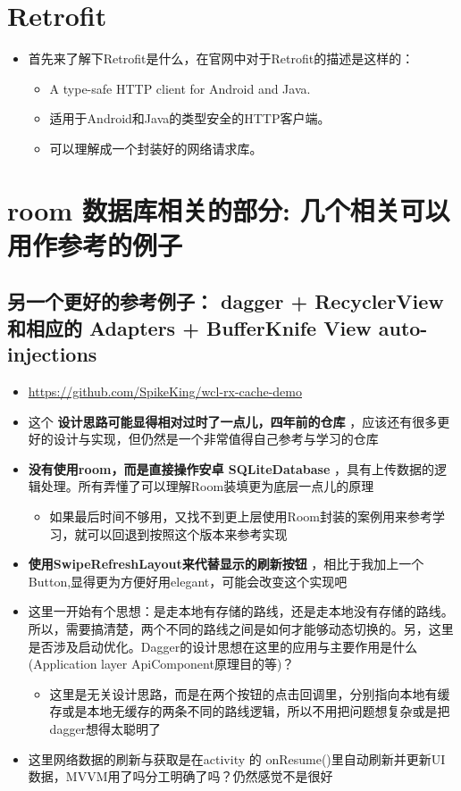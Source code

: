 \documentclass[9pt, b5paper]{article}
\begin{document}
\section{Retrofit}
\label{sec-5}
\begin{itemize}
\item 首先来了解下Retrofit是什么，在官网中对于Retrofit的描述是这样的：
\begin{itemize}
\item A type-safe HTTP client for Android and Java.
\item 适用于Android和Java的类型安全的HTTP客户端。
\item 可以理解成一个封装好的网络请求库。
\end{itemize}
\end{itemize}
\section{room 数据库相关的部分: 几个相关可以用作参考的例子}
\label{sec-6}
\subsection{另一个更好的参考例子： dagger + RecyclerView 和相应的 Adapters + BufferKnife View auto-injections}
\label{sec-6-1}
\begin{itemize}
\item \url{https://github.com/SpikeKing/wcl-rx-cache-demo}
\item 这个 \textbf{设计思路可能显得相对过时了一点儿，四年前的仓库} ，应该还有很多更好的设计与实现，但仍然是一个非常值得自己参考与学习的仓库
\item \textbf{没有使用room，而是直接操作安卓 SQLiteDatabase} ，具有上传数据的逻辑处理。所有弄懂了可以理解Room装填更为底层一点儿的原理
\begin{itemize}
\item 如果最后时间不够用，又找不到更上层使用Room封装的案例用来参考学习，就可以回退到按照这个版本来参考实现
\end{itemize}
\item \textbf{使用SwipeRefreshLayout来代替显示的刷新按钮} ，相比于我加上一个Button,显得更为方便好用elegant，可能会改变这个实现吧
\item 这里一开始有个思想：是走本地有存储的路线，还是走本地没有存储的路线。所以，需要搞清楚，两个不同的路线之间是如何才能够动态切换的。另，这里是否涉及启动优化。Dagger的设计思想在这里的应用与主要作用是什么(Application layer ApiComponent原理目的等)？
\begin{itemize}
\item 这里是无关设计思路，而是在两个按钮的点击回调里，分别指向本地有缓存或是本地无缓存的两条不同的路线逻辑，所以不用把问题想复杂或是把dagger想得太聪明了
\end{itemize}
\item 这里网络数据的刷新与获取是在activity 的 onResume()里自动刷新并更新UI数据，MVVM用了吗分工明确了吗？仍然感觉不是很好
\end{itemize}
\end{document}
